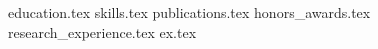 \documentclass[11pt, a4paper]{awesome-cv}
\newcommand*{\sectiondir}{resume/}
\begin{document}
\makecvheader

{education.tex}
{skills.tex}
{publications.tex}
{honors_awards.tex}
{research_experience.tex}
{ex.tex}
\end{document}
